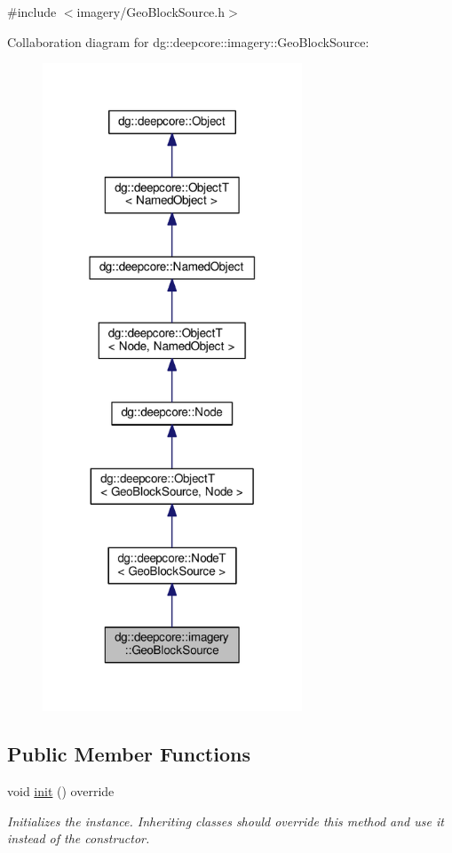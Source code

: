 {\ttfamily \#include $<$imagery/\+Geo\+Block\+Source.\+h$>$}



Collaboration diagram for dg\+:\+:deepcore\+:\+:imagery\+:\+:Geo\+Block\+Source\+:
\nopagebreak
\begin{figure}[H]
\begin{center}
\leavevmode
\includegraphics[width=219pt]{classdg_1_1deepcore_1_1imagery_1_1_geo_block_source__coll__graph}
\end{center}
\end{figure}
\subsection*{Public Member Functions}
\begin{DoxyCompactItemize}
\item 
void \hyperlink{classdg_1_1deepcore_1_1imagery_1_1_geo_block_source_ab2c6a896dd65ca8d010248b69131c151}{init} () override
\begin{DoxyCompactList}\small\item\em Initializes the instance. Inheriting classes should override this method and use it instead of the constructor. \end{DoxyCompactList}\end{DoxyCompactItemize}
